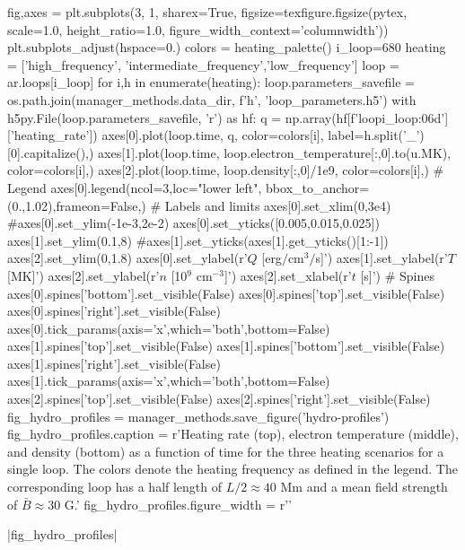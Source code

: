 \begin{pycode}
fig,axes = plt.subplots(3, 1, sharex=True,
                        figsize=texfigure.figsize(pytex, scale=1.0, height_ratio=1.0,
                                                  figure_width_context='columnwidth'))
plt.subplots_adjust(hspace=0.)
colors = heating_palette()
i_loop=680
heating = ['high_frequency', 'intermediate_frequency','low_frequency']
loop = ar.loops[i_loop]
for i,h in enumerate(heating):
    loop.parameters_savefile = os.path.join(manager_methods.data_dir, f'{h}', 'loop_parameters.h5')
    with h5py.File(loop.parameters_savefile, 'r') as hf:
        q = np.array(hf[f'loop{i_loop:06d}']['heating_rate'])
    axes[0].plot(loop.time, q, color=colors[i], label=h.split('_')[0].capitalize(),)
    axes[1].plot(loop.time, loop.electron_temperature[:,0].to(u.MK), color=colors[i],)
    axes[2].plot(loop.time, loop.density[:,0]/1e9, color=colors[i],)
# Legend
axes[0].legend(ncol=3,loc="lower left", bbox_to_anchor=(0.,1.02),frameon=False,)
# Labels and limits
axes[0].set_xlim(0,3e4)
#axes[0].set_ylim(-1e-3,2e-2)
axes[0].set_yticks([0.005,0.015,0.025])
axes[1].set_ylim(0.1,8)
#axes[1].set_yticks(axes[1].get_yticks()[1:-1])
axes[2].set_ylim(0,1.8)
axes[0].set_ylabel(r'$Q$ [erg$/$cm$^{3}$$/$s]')
axes[1].set_ylabel(r'$T$ [MK]')
axes[2].set_ylabel(r'$n$ [10$^9$ cm$^{-3}$]')
axes[2].set_xlabel(r'$t$ [s]')
# Spines
axes[0].spines['bottom'].set_visible(False)
axes[0].spines['top'].set_visible(False)
axes[0].spines['right'].set_visible(False)
axes[0].tick_params(axis='x',which='both',bottom=False)
axes[1].spines['top'].set_visible(False)
axes[1].spines['bottom'].set_visible(False)
axes[1].spines['right'].set_visible(False)
axes[1].tick_params(axis='x',which='both',bottom=False)
axes[2].spines['top'].set_visible(False)
axes[2].spines['right'].set_visible(False)
fig_hydro_profiles = manager_methods.save_figure('hydro-profiles')
fig_hydro_profiles.caption = r'Heating rate (top), electron temperature (middle), and density (bottom) as a function of time for the three heating scenarios for a single loop. The colors denote the heating frequency as defined in the legend. The corresponding loop has a half length of $L/2\approx40$ Mm and a mean field strength of $\bar{B}\approx30$ G.'
fig_hydro_profiles.figure_width = r'\columnwidth'
\end{pycode}
|fig_hydro_profiles|

